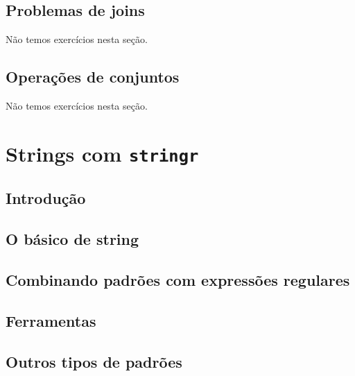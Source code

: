 \documentclass[
]{latex/krantz}
\theoremstyle{definition}
\theoremstyle{definition}
\theoremstyle{definition}
\theoremstyle{definition}
\theoremstyle{remark}
\begin{document}
\hypertarget{problemas-de-joins}{%
\section{Problemas de joins}\label{problemas-de-joins}}

Não temos exercícios nesta seção.

\hypertarget{operauxe7uxf5es-de-conjuntos}{%
\section{Operações de conjuntos}\label{operauxe7uxf5es-de-conjuntos}}

Não temos exercícios nesta seção.

\hypertarget{strings-com-stringr}{%
\chapter{\texorpdfstring{Strings com \texttt{stringr}}{Strings com stringr}}\label{strings-com-stringr}}

\hypertarget{introduuxe7uxe3o-7}{%
\section{Introdução}\label{introduuxe7uxe3o-7}}

\hypertarget{o-buxe1sico-de-string}{%
\section{O básico de string}\label{o-buxe1sico-de-string}}

\hypertarget{combinando-padruxf5es-com-expressuxf5es-regulares}{%
\section{Combinando padrões com expressões regulares}\label{combinando-padruxf5es-com-expressuxf5es-regulares}}

\hypertarget{ferramentas}{%
\section{Ferramentas}\label{ferramentas}}

\hypertarget{outros-tipos-de-padruxf5es}{%
\section{Outros tipos de padrões}\label{outros-tipos-de-padruxf5es}}
\end{document}
